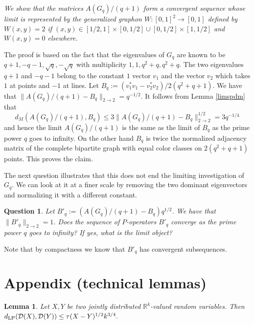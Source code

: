 \documentclass[a4wider]{amsart}
\newtheorem{question}[theorem]{Question}
\newtheorem{lemma}[theorem]{Lemma}
\theoremstyle{definitionbreak}\newtheorem{D}[theorem]{Definition}
\theoremstyle{definitionbreak}\newtheorem*{D*}{Definition}
\begin{document}
{\it We show that the matrices $A(G_q)/(q+1)$ form a convergent sequence whose limit is represented by the generalized graphon $W:[0,1]^2\to [0,1]$ defined by $W(x,y)=2$ if $(x,y)\in [1/2,1]\times [0,1/2]\cup[0,1/2]\times [1,1/2]$ and $W(x,y)=0$ elsewhere.}

The proof is based on the fact that the eigenvalues of $G_q$ are known to be $q+1,-q-1,\sqrt{q},-\sqrt{q}$ with multiplicity $1,1,q^2+q,q^2+q$. The two eigenvalues $q+1$ and $-q-1$ belong to the constant $1$ vector $v_1$ and the vector $v_2$ which takes $1$ at points and $-1$ at lines. Let $B_q:=(v_1^*v_1-v_2^*v_2)/2(q^2+q+1)$. We have that $\|A(G_q)/(q+1)-B_q\|_{2\to 2}=q^{-1/2}$. It follows from Lemma \ref{limspdm} that
$$d_M(A(G_q)/(q+1),B_q)\leq 3\|A(G_q)/(q+1)-B_q\|_{2\to 2}^{1/2}=3q^{-1/4}$$ and hence the limit $A(G_q)/(q+1)$ is the same as the limit of $B_q$ as the prime power $q$ goes to infinity. On the other hand $B_q$ is twice the normalized adjacency matrix of the complete bipartite graph with equal color classes on $2(q^2+q+1)$ points. This proves the claim.

The next question illustrates that this does not end the limiting investigation of $G_q$. We can look at it at a finer scale by removing the two dominant eigenvectors and normalizing it with a different constant.

\begin{question} Let $B'_q:=(A(G_q)/(q+1)-B_q)q^{1/2}$.  We have that $\|B'_q\|_{2\to 2}=1$. Does the sequence of $P$-operators $B'_q$ converge as the prime power $q$ goes to infinity? If yes, what is the limit object?
\end{question}

Note that by compactness we know that $B'_q$ has convergent subsequences. 



\section{Appendix (technical lemmas)}

\begin{lemma}\label{coupdist} Let $X,Y$ be two jointly distributed $\mathbb{R}^k$-valued random variables. Then $d_{\rm LP}(\mathcal{D}(X),\mathcal{D}(Y))\leq \tau(X-Y)^{1/2}k^{3/4}.$
\end{lemma}
\end{document}
